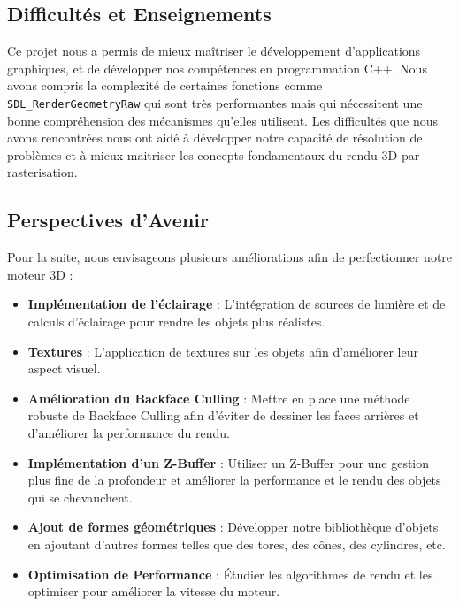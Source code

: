 \documentclass[12pt]{article}
\begin{document}
\subsection{Difficultés et Enseignements}

\noindent Ce projet nous a permis de mieux maîtriser le développement d'applications graphiques, et de développer nos compétences en programmation C++. Nous avons compris la complexité de certaines fonctions comme \texttt{SDL\_RenderGeometryRaw} qui sont très performantes mais qui nécessitent une bonne compréhension des mécanismes qu'elles utilisent. Les difficultés que nous avons rencontrées nous ont aidé à développer notre capacité de résolution de problèmes et à mieux maitriser les concepts fondamentaux du rendu 3D par rasterisation.

\subsection{Perspectives d'Avenir}
\label{subsec:perspectives_avenir}

\noindent Pour la suite, nous envisageons plusieurs améliorations afin de perfectionner notre moteur 3D :
\begin{itemize}
  \item \textbf{Implémentation de l'éclairage} : L'intégration de sources de lumière et de calculs d'éclairage pour rendre les objets plus réalistes.
  \item \textbf{Textures} : L'application de textures sur les objets afin d'améliorer leur aspect visuel.
    \item \textbf{Amélioration du Backface Culling} : Mettre en place une méthode robuste de Backface Culling afin d'éviter de dessiner les faces arrières et d'améliorer la performance du rendu.
    \item  \textbf{Implémentation d'un Z-Buffer} : Utiliser un Z-Buffer pour une gestion plus fine de la profondeur et améliorer la performance et le rendu des objets qui se chevauchent.
    \item \textbf{Ajout de formes géométriques} : Développer notre bibliothèque d'objets en ajoutant d'autres formes telles que des tores, des cônes, des cylindres, etc.
    \item \textbf{Optimisation de Performance} : Étudier les algorithmes de rendu et les optimiser pour améliorer la vitesse du moteur.
\end{itemize}
\end{document}

